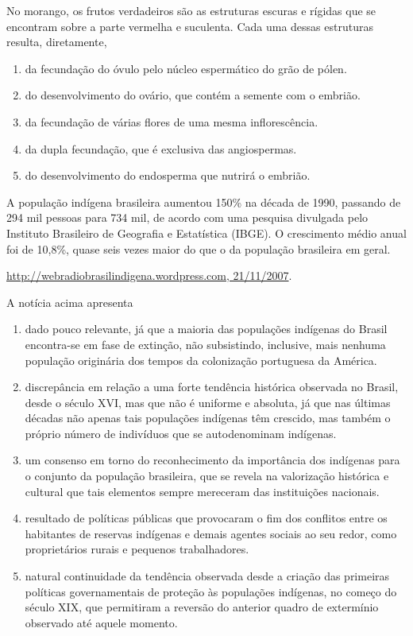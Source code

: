 \documentclass[twocolumn,landscape]{amsart}
\begin{document}
\begin{questao}
  No morango, os frutos verdadeiros são as estruturas escuras e rígidas
  que se encontram sobre a parte vermelha e suculenta. Cada uma dessas
  estruturas resulta, diretamente,
  \begin{enumerate}[\bf a.]
    \item da fecundação do óvulo pelo núcleo espermático do
    grão de pólen.
    \item do desenvolvimento do ovário, que contém a
    semente com o embrião. %
    \item da fecundação de várias flores de uma mesma
    inflorescência.
    \item da dupla fecundação, que é exclusiva das
    angiospermas.
    \item do desenvolvimento do endosperma que nutrirá o embrião.
  \end{enumerate}
\end{questao}
\clearpage

\begin{questao}
  A população indígena brasileira aumentou 150\% na década de 1990,
  passando de 294 mil pessoas para 734 mil, de acordo com uma pesquisa
  divulgada pelo Instituto Brasileiro de Geografia e Estatística
  (IBGE). O crescimento médio anual foi de 10,8\%, quase seis vezes
  maior do que o da população brasileira em geral.
  \begin{flushright}
    \url{http://webradiobrasilindigena.wordpress.com, 21/11/2007}.
  \end{flushright}
  A notícia acima apresenta
  \begin{enumerate}[\bf a.]
    \item dado pouco relevante, já que a maioria das populações
    indígenas do Brasil encontra-se em fase de extinção, não
    subsistindo, inclusive, mais nenhuma população originária dos tempos
    da colonização portuguesa da América.
    \item discrepância em relação a uma forte tendência histórica
    observada no Brasil, desde o século XVI, mas que não é uniforme e
    absoluta, já que nas últimas décadas não apenas tais populações
    indígenas têm crescido, mas também o próprio número de indivíduos
    que se autodenominam indígenas.%
    \item um consenso em torno do reconhecimento da importância dos
    indígenas para o conjunto da população brasileira, que se revela na
    valorização histórica e cultural que tais elementos sempre mereceram
    das instituições nacionais.
    \item resultado de políticas públicas que provocaram o fim dos
    conflitos entre os habitantes de reservas indígenas e demais agentes
    sociais ao seu redor, como proprietários rurais e pequenos
    trabalhadores.
    \item natural continuidade da tendência observada desde a criação
    das primeiras políticas governamentais de proteção às populações
    indígenas, no começo do século XIX, que permitiram a reversão do
    anterior quadro de extermínio observado até aquele momento.
  \end{enumerate}
\end{questao}
\clearpage
\end{document}
